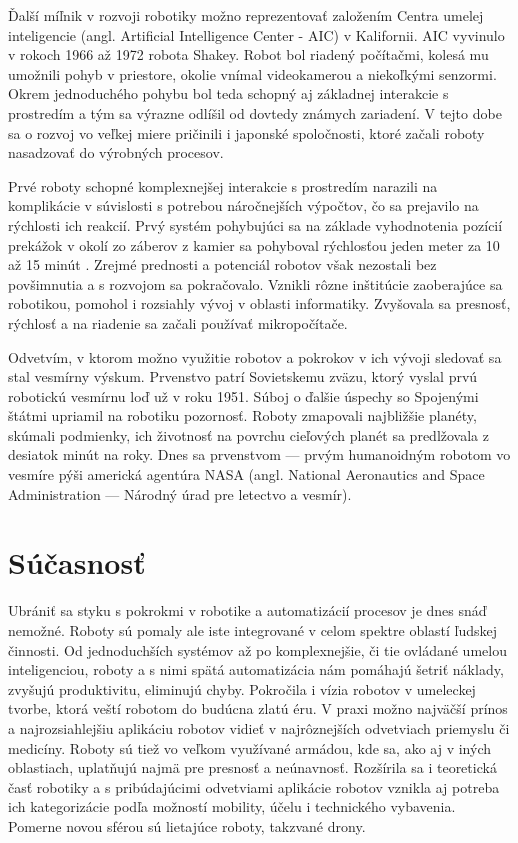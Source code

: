 Ďalší míľnik v rozvoji robotiky možno reprezentovať založením Centra umelej inteligencie (angl. Artificial Intelligence Center - AIC) v Kalifornii. AIC vyvinulo v rokoch 1966 až 1972 robota Shakey. Robot bol riadený počítačmi, kolesá mu umožnili pohyb v priestore, okolie vnímal videokamerou a niekoľkými senzormi. Okrem jednoduchého pohybu bol teda schopný aj základnej interakcie s prostredím a tým sa výrazne odlíšil od dovtedy známych zariadení. V tejto dobe sa o rozvoj vo veľkej miere pričinili i japonské spoločnosti, ktoré začali roboty nasadzovať do výrobných procesov.

Prvé roboty schopné komplexnejšej interakcie s prostredím narazili na komplikácie v súvislosti s potrebou náročnejších výpočtov, čo sa prejavilo na rýchlosti ich reakcií. Prvý systém pohybujúci sa na základe vyhodnotenia pozícií prekážok v okolí zo záberov z kamier sa pohyboval rýchlosťou jeden meter za 10 až 15 minút \cite{RoboticsAndAutomationHandbook}. Zrejmé prednosti a potenciál robotov však nezostali bez povšimnutia a s rozvojom sa pokračovalo. Vznikli rôzne inštitúcie zaoberajúce sa robotikou, pomohol i rozsiahly vývoj v oblasti informatiky. Zvyšovala sa presnosť, rýchlosť a na riadenie sa začali používať mikropočítače.

Odvetvím, v ktorom možno využitie robotov a pokrokov v ich vývoji sledovať sa stal vesmírny výskum. Prvenstvo patrí Sovietskemu zväzu, ktorý vyslal prvú robotickú vesmírnu loď už v roku 1951. Súboj o ďalšie úspechy so Spojenými štátmi upriamil na robotiku pozornosť. Roboty zmapovali najbližšie planéty, skúmali podmienky, ich životnosť na povrchu cieľových planét sa predlžovala z desiatok minút na roky. Dnes sa prvenstvom --- prvým humanoidným robotom vo vesmíre pýši americká agentúra NASA (angl. National Aeronautics and Space Administration --- Národný úrad pre letectvo a vesmír).

\section{Súčasnosť}
Ubrániť sa styku s pokrokmi v robotike a automatizácií procesov je dnes snáď nemožné. Roboty sú pomaly ale iste integrované v celom spektre oblastí ľudskej činnosti. Od jednoduchších systémov až po komplexnejšie, či tie ovládané umelou inteligenciou, roboty a s nimi spätá automatizácia nám pomáhajú šetriť náklady, zvyšujú produktivitu, eliminujú chyby. Pokročila i vízia robotov v umeleckej tvorbe, ktorá veští robotom do budúcna zlatú éru. V praxi možno najväčší prínos a najrozsiahlejšiu aplikáciu robotov vidieť v najrôznejších odvetviach priemyslu či medicíny. Roboty sú tiež vo veľkom využívané armádou, kde sa, ako aj v iných oblastiach, uplatňujú najmä pre presnosť a neúnavnosť. Rozšírila sa i teoretická časť robotiky a s pribúdajúcimi odvetviami aplikácie robotov vznikla aj potreba ich kategorizácie podľa možností mobility, účelu i technického vybavenia. Pomerne novou sférou sú lietajúce roboty, takzvané drony.

